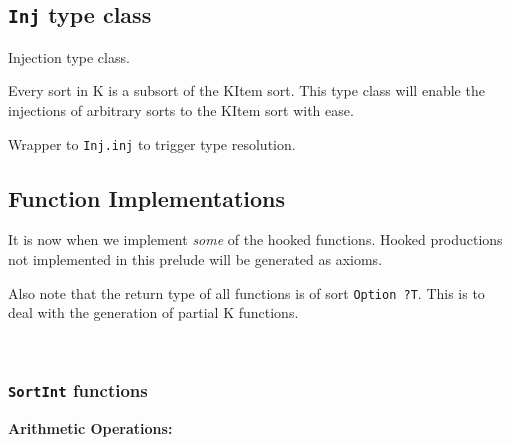 \subsection{\texttt{Inj} type class}
\begin{definition}[Inj]\label{Inj}\leanok
Injection type class.

Every sort in K is a subsort of the KItem sort. This type class will enable the
injections of arbitrary sorts to the KItem sort with ease.
\end{definition}
\begin{definition}[inj]\label{inj}\leanok{}
Wrapper to \texttt{Inj.inj} to trigger type resolution.
\end{definition}

\subsection{Function Implementations}

It is now when we implement \textit{some} of the hooked functions.
Hooked productions not implemented in this prelude will be generated as axioms.

Also note that the return type of all functions is of sort \texttt{Option ?T}.
This is to deal with the generation of partial K functions.

\\
\subsubsection{\texttt{SortInt} functions}

\textbf{Arithmetic Operations:}

